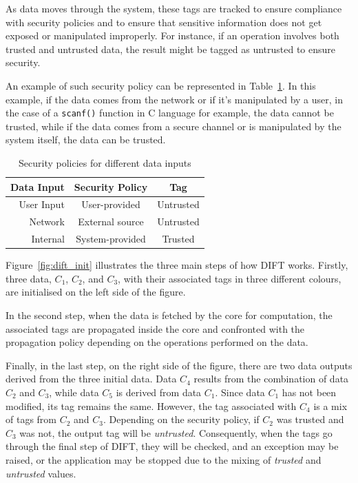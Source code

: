 As data moves through the system, these tags are tracked to ensure compliance with security policies and to ensure that sensitive information does not get exposed or manipulated improperly. For instance, if an operation involves both trusted and untrusted data, the result might be tagged as untrusted to ensure security.

An example of such security policy can be represented in Table~\ref{table:security_policies}. In this example, if the data comes from the network or if it's manipulated by a user, in the case of a \verb|scanf()| function in C language for example, the data cannot be trusted, while if the data comes from a secure channel or is manipulated by the system itself, the data can be trusted.

\begin{table}[ht]
    \centering
    \caption{Security policies for different data inputs}
    \label{table:security_policies}
    \begin{tabular}{@{}rcc@{}}
        \toprule
        \textbf{Data Input} & \textbf{Security Policy} & \textbf{Tag}     \\ \midrule
        User Input          & User-provided            & Untrusted        \\ \hline
        Network             & External source          & Untrusted        \\ \hline
        Internal            & System-provided          & Trusted          \\
        \bottomrule
    \end{tabular}
\end{table}

Figure~\ref{fig:dift_init} illustrates the three main steps of how DIFT works. Firstly, three data, $C_1$, $C_2$, and $C_3$, with their associated tags in three different colours, are initialised on the left side of the figure.

In the second step, when the data is fetched by the core for computation, the associated tags are propagated inside the core and confronted with the propagation policy depending on the operations performed on the data.

Finally, in the last step, on the right side of the figure, there are two data outputs derived from the three initial data. Data $C_4$ results from the combination of data $C_2$ and $C_3$, while data $C_5$ is derived from data $C_1$. Since data $C_1$ has not been modified, its tag remains the same. However, the tag associated with $C_4$ is a mix of tags from $C_2$ and $C_3$. Depending on the security policy, if $C_2$ was trusted and $C_3$ was not, the output tag will be \textit{untrusted}. Consequently, when the tags go through the final step of DIFT, they will be checked, and an exception may be raised, or the application may be stopped due to the mixing of \textit{trusted} and \textit{untrusted} values.

